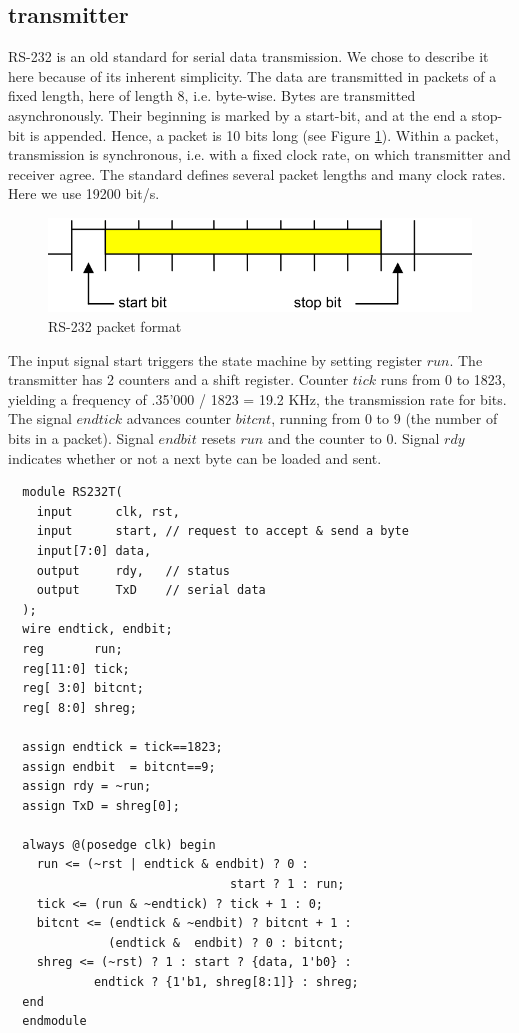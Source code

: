 \subsection{transmitter}
RS-232 is an old standard for serial data transmission. We chose to describe it here because of its
inherent simplicity. The data are transmitted in packets of a fixed length, here of length 8, i.e.
byte-wise. Bytes are transmitted asynchronously. Their beginning is marked by a start-bit, and at
the end a stop-bit is appended. Hence, a packet is 10 bits long (see Figure \ref{fig:rs232}).
Within a packet, transmission is synchronous, i.e. with a fixed clock rate, on which transmitter
and receiver agree. The standard defines several packet lengths and many clock rates. Here we use
19200 bit/s.
\begin{figure}[h!]
  \centering
  \includegraphics[width=.9\textwidth]{i/c.png}
  \caption{RS-232 packet format}
  \label{fig:rs232}
\end{figure}

The input signal start triggers the state machine by setting register $run$. The transmitter has 2
counters and a shift register. Counter $tick$ runs from 0 to 1823, yielding a frequency of .35’000
/ 1823 = 19.2 KHz, the transmission rate for bits. The signal $endtick$ advances counter $bitcnt$,
running from 0 to 9 (the number of bits in a packet). Signal $endbit$ resets $run$ and the counter
to 0. Signal $rdy$ indicates whether or not a next byte can be loaded and sent.
\begin{verbatim}
  module RS232T(
    input      clk, rst,
    input      start, // request to accept & send a byte
    input[7:0] data,
    output     rdy,   // status
    output     TxD    // serial data
  );
  wire endtick, endbit;
  reg       run;
  reg[11:0] tick;
  reg[ 3:0] bitcnt;
  reg[ 8:0] shreg;

  assign endtick = tick==1823;
  assign endbit  = bitcnt==9;
  assign rdy = ~run;
  assign TxD = shreg[0];

  always @(posedge clk) begin
    run <= (~rst | endtick & endbit) ? 0 :
                               start ? 1 : run;
    tick <= (run & ~endtick) ? tick + 1 : 0;
    bitcnt <= (endtick & ~endbit) ? bitcnt + 1 :
              (endtick &  endbit) ? 0 : bitcnt;
    shreg <= (~rst) ? 1 : start ? {data, 1'b0} :
            endtick ? {1'b1, shreg[8:1]} : shreg;
  end
  endmodule
\end{verbatim}

